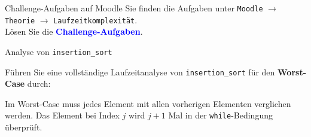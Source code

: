\begin{frame}{Challenge-Aufgaben auf Moodle}
	Sie finden die Aufgaben unter \texttt{Moodle} $\rightarrow$ \texttt{Theorie} $\rightarrow$ \texttt{Laufzeitkomplexität}.\\
	\vspace{1.0cm}	
	Lösen Sie die \textcolor{Blue}{\textbf{Challenge-Aufgaben}}.
\end{frame}


\begin{frame}[fragile]{Analyse von \texttt{insertion\_sort}}
	\begin{myexercise}
		{\small
		Führen Sie eine vollständige Laufzeitanalyse von \texttt{insertion\_sort} für den \textbf{Worst-Case} durch:
		}
		
	\end{myexercise}
\end{frame}

\begin{frame}
	\begin{myanswer}
		Im Worst-Case muss jedes Element mit allen vorherigen Elementen verglichen werden. Das Element bei Index $j$ wird $j+1$ Mal in der \lstinline{while}-Bedingung überprüft.
	\end{myanswer}
\end{frame}

